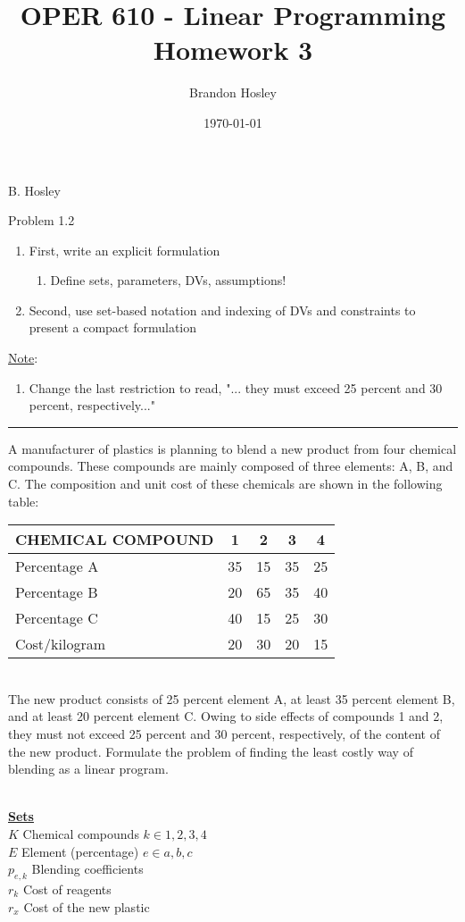 \documentclass[answers]{exam}
\title{OPER 610 - Linear Programming%
	\\ Homework 3}
\author{Brandon Hosley}
\date{\today}
\begin{document}
\hspace{\fill} { B. Hosley}
\bigskip

\begin{questions}

\question 
Problem 1.2
\begin{enumerate}
	\item First, write an explicit formulation
	\begin{enumerate}
		\item Define sets, parameters, DVs, assumptions!
	\end{enumerate}
\item Second, use set-based notation and indexing of DVs and constraints to present a compact formulation
\end{enumerate}
\underline{Note}:
\begin{enumerate}
	\item Change the last restriction to read, "... they must exceed 25 percent and 30 percent, respectively..."
\end{enumerate}
\hrule
\bigskip
[1.2] A manufacturer of plastics is planning to blend a new product from four chemical compounds. These compounds are mainly composed of three elements: A, B, and C. The composition and unit cost of these chemicals are shown in the following table: \bigskip \\ 
\begin{tabular}{lcccc}
	\toprule
	CHEMICAL COMPOUND & 1 & 2 & 3 & 4 \\
	\midrule
	Percentage A  & 35 & 15 & 35 & 25 \\
	Percentage B  & 20 & 65 & 35 & 40 \\
	Percentage C  & 40 & 15 & 25 & 30 \\
	Cost/kilogram & 20 & 30 & 20 & 15 \\
	\bottomrule 
\end{tabular} \bigskip \\ 
The new product consists of 25 percent element A, at least 35 percent element B, and at least 20 percent element C. Owing to side effects of compounds 1 and 2, they must not exceed 25 percent and 30 percent, respectively, of the content of the new product. Formulate the problem of finding the least costly way of blending as a linear program.
\begin{solution} \\
	\textbf{\underline{Sets}} \\
	\(K\) Chemical compounds \(k\in{1,2,3,4}\) \\
	\(E\) Element (percentage) \(e\in{a,b,c}\) \\
	\(p_{e,k}\) Blending coefficients \\
	\(r_{k}\) Cost of reagents \\
	\(r_{x}\) Cost of the new plastic \\
	

\end{solution}
\end{questions}
\end{document}
